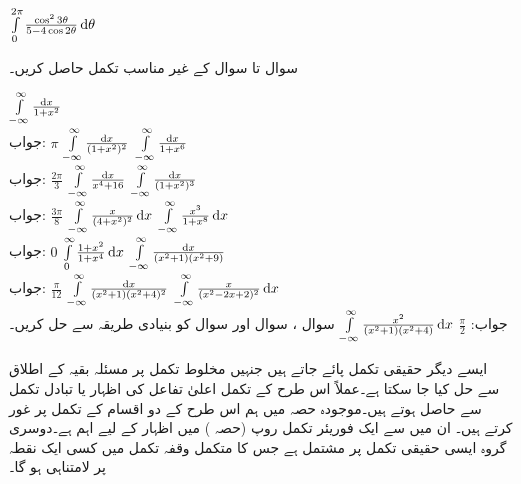 \quad
$\int\limits_{0}^{2\pi} \frac{\cos^2 3\theta}{5-4\cos2\theta}\dif \theta$


سوال  تا سوال  کے غیر مناسب تکمل حاصل کریں۔

\quad
$\int\limits_{-\infty}^{\infty}\tfrac{\dif x}{1+x^2}$\\
جواب:\quad
$\pi$
\quad
$\int\limits_{-\infty}^{\infty}\tfrac{\dif x}{(1+x^2)^2}$
\quad
$\int\limits_{-\infty}^{\infty}\tfrac{\dif x}{1+x^6}$\\
جواب:\quad
$\tfrac{2\pi}{3}$
\quad
$\int\limits_{-\infty}^{\infty}\tfrac{\dif x}{x^4+16}$
\quad
$\int\limits_{-\infty}^{\infty}\tfrac{\dif x}{(1+x^2)^3}$\\
جواب:\quad
$\tfrac{3\pi}{8}$
\quad
$\int\limits_{-\infty}^{\infty}\tfrac{x}{(4+x^2)^2}\dif x$
\quad
$\int\limits_{-\infty}^{\infty}\tfrac{x^3}{1+x^8}\dif x$\\
جواب:\quad
$0$
\quad
$\int\limits_{0}^{\infty}\tfrac{1+x^2}{1+x^4}\dif x$
\quad
$\int\limits_{-\infty}^{\infty}\tfrac{\dif x}{(x^2+1)(x^2+9)}$\\
جواب:\quad
$\tfrac{\pi}{12}$
\quad
$\int\limits_{-\infty}^{\infty}\tfrac{\dif x}{(x^2+1)(x^2+4)^2}$
\quad
$\int\limits_{-\infty}^{\infty}\tfrac{x}{(x^2-2x+2)^2}\dif x$\\
جواب:\quad
$\tfrac{\pi}{2}$
\quad
$\int\limits_{-\infty}^{\infty}\tfrac{x^2}{(x^2+1)(x^2+4)}\dif x$
\quad
سوال ، سوال  اور سوال  کو بنیادی طریقہ سے حل کریں۔

ایسے دیگر حقیقی تکمل پائے جاتے ہیں جنہیں مخلوط تکمل پر مسئلہ بقیہ کے اطلاق سے حل کیا جا سکتا ہے۔عملاً اس طرح کے تکمل اعلیٰ تفاعل کی اظہار یا تبادل تکمل سے حاصل ہوتے ہیں۔موجودہ حصہ میں ہم اس طرح کے دو اقسام  کے تکمل پر غور کرتے ہیں۔ ان میں سے ایک فوریئر تکمل روپ (حصہ ) میں اظہار کے لیے اہم ہے۔دوسری گروہ ایسی حقیقی تکمل پر مشتمل ہے جس کا متکمل وقفہ تکمل میں کسی ایک نقطہ پر لامتناہی ہو گا۔

